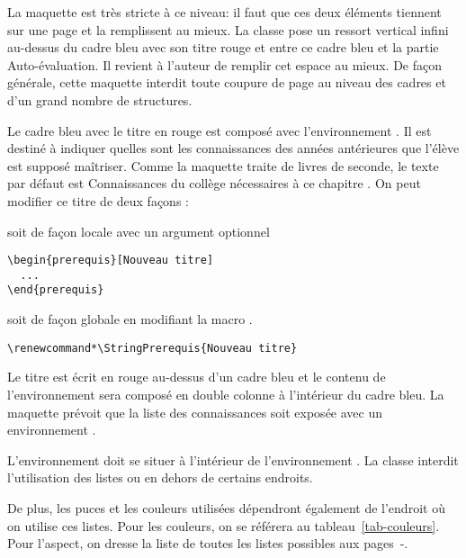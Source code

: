 \documentclass[nocrop]{sesamanuel}
\begin{document}
\begin{attention}
  La maquette est très stricte à ce niveau: il faut que ces deux
  éléments tiennent sur une page et la remplissent au mieux. La classe
  pose un ressort vertical infini au-dessus du cadre bleu avec son
  titre rouge et entre ce cadre bleu et la partie Auto-évaluation. Il
  revient à l'auteur de remplir cet espace au mieux. De façon
  générale, cette maquette interdit toute coupure de page au niveau
  des cadres et d'un grand nombre de structures.
\end{attention}
Le cadre bleu avec le titre en rouge est composé avec l'environnement
. Il est destiné à indiquer quelles sont les
connaissances des années antérieures que l'élève est supposé
maîtriser. Comme la maquette traite de livres de seconde, le texte par
défaut est \og Connaissances du collège nécessaires à ce chapitre
\fg{}. On peut modifier ce titre de deux façons :
\begin{syntaxe}

  soit de façon locale avec un argument optionnel
  \begin{code}
\begin{verbatim}
\begin{prerequis}[Nouveau titre]
  ...
\end{prerequis}
\end{verbatim}
\end{code}
  soit de façon globale en modifiant la macro
  .
  \begin{code}
\begin{verbatim}
\renewcommand*\StringPrerequis{Nouveau titre}
\end{verbatim}
\end{code}
\end{syntaxe}

Le titre est écrit en rouge au-dessus d'un cadre bleu et le contenu de
l'environnement sera composé en double colonne à l'intérieur du cadre
bleu. La maquette prévoit que la liste des connaissances soit exposée
avec un environnement .
\begin{remarque}
  L'environnement  doit se situer à l'intérieur de
  l'environnement . La classe interdit
  l'utilisation des listes  ou  en
  dehors de certains endroits.

  De plus, les puces et les couleurs utilisées dépendront également
  de l'endroit où on utilise ces listes. Pour les couleurs, on se
  référera au tableau~\ref{tab-couleurs}. Pour l'aspect, on dresse la
  liste de toutes les listes possibles aux pages~\pageref{liste-debut-listes}-\pageref{liste-fin-listes}.
\end{remarque}
\end{document}
